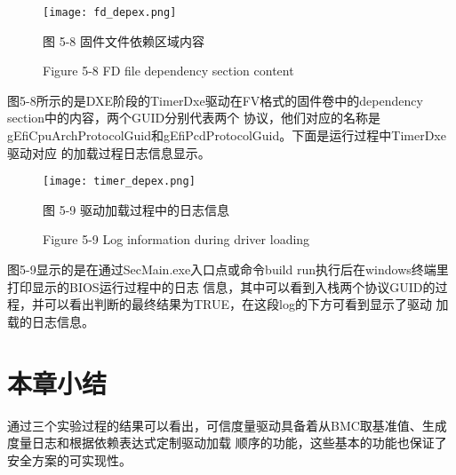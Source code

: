 \begin{figure}[H]
    \vspace{0cm}   
    \setlength{\abovecaptionskip}{0.3cm}
	\centering
    \texttt{[image: fd\_depex.png]}
    \caption*{图 5-8 固件文件依赖区域内容}
    \setlength{\belowcaptionskip}{-0.7cm}
    \caption*{Figure 5-8 FD file dependency section content}
\end{figure}

图5-8所示的是DXE阶段的TimerDxe驱动在FV格式的固件卷中的dependency section中的内容，两个GUID分别代表两个
协议，他们对应的名称是gEfiCpuArchProtocolGuid和gEfiPcdProtocolGuid。下面是运行过程中TimerDxe驱动对应
的加载过程日志信息显示。

\begin{figure}[H]
    \vspace{0cm}   
    \setlength{\abovecaptionskip}{0.3cm}
	\centering
    \texttt{[image: timer\_depex.png]}
    \caption*{图 5-9 驱动加载过程中的日志信息}
    \setlength{\belowcaptionskip}{-0.7cm}
    \caption*{Figure 5-9 Log information during driver loading}
\end{figure}

图5-9显示的是在通过SecMain.exe入口点或命令build run执行后在windows终端里打印显示的BIOS运行过程中的日志
信息，其中可以看到入栈两个协议GUID的过程，并可以看出判断的最终结果为TRUE，在这段log的下方可看到显示了驱动
加载的日志信息。

%
%
\section{本章小结}
通过三个实验过程的结果可以看出，可信度量驱动具备着从BMC取基准值、生成度量日志和根据依赖表达式定制驱动加载
顺序的功能，这些基本的功能也保证了安全方案的可实现性。

\bjutclearpage
